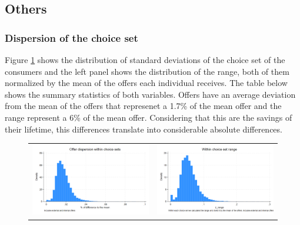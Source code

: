 \documentclass[12pt]{article}
\begin{document}
\subsection{Others}

\subsubsection{Dispersion of the choice set}
Figure \ref{fig:ie3_5} shows the distribution of standard deviations of the choice set of the consumers and the left panel shows the distribution of the range, both of them normalized by the mean of the offers each individual receives.  The table below shows the summary statistics of both variables. Offers have an average deviation from the mean of the offers that represenet a 1.7\% of the mean offer and the range represent a 6\% of the mean offer. Considering that this are the savings of their lifetime, this differences translate into considerable absolute differences.

\begin{figure}[H] 
\caption{}
\label{fig:ie3_5}
\centering{}%
\begin{tabular}{cc}
\includegraphics[scale=0.26]{figures/IE3_dispertion_choice_set.png} & \includegraphics[scale=0.26]{figures/IE3_dispertion_choice_set_range.png}
\end{tabular}
\end{figure}
\end{document}

